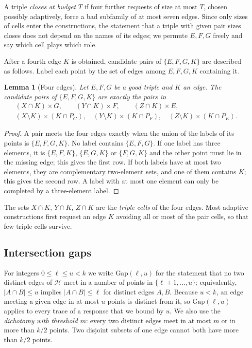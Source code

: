 \documentclass[11pt]{article}
\numberwithin{equation}{section}
\newtheorem{lemma}[theorem]{Lemma}
\theoremstyle{definition}
\theoremstyle{remark}
\newcommand{\HH}{\mathcal H}
\newcommand{\Gap}{\mathrm{Gap}}
\begin{document}
A triple \emph{closes at budget $T$} if four further requests of size at
most $T$, chosen possibly adaptively, force a bad subfamily of at most
seven edges. Since only sizes of cells enter the constructions, the
statement that a triple with given pair sizes closes does not depend on
the names of its edges; we permute $E,F,G$ freely and say which cell
plays which role.

After a fourth edge $K$ is obtained, candidate pairs of $\{E,F,G,K\}$
are described as follows. Label each point by the set of edges among
$E,F,G,K$ containing it.

\begin{lemma}[Four edges]\label{lem:foursets}
Let $E,F,G$ be a good triple and $K$ an edge. The candidate pairs of
$\{E,F,G,K\}$ are exactly the pairs in
\begin{gather*}
 (X\cap K)\times G,\qquad (Y\cap K)\times F,\qquad (Z\cap K)\times E,\\
 (X\setminus K)\times(K\cap P_G),\quad
 (Y\setminus K)\times(K\cap P_F),\quad
 (Z\setminus K)\times(K\cap P_E).
\end{gather*}
\end{lemma}
\begin{proof}
A pair meets the four edges exactly when the union of the labels of its
points is $\{E,F,G,K\}$. No label contains $\{E,F,G\}$. If one label has
three elements, it is $\{E,F,K\}$, $\{E,G,K\}$ or $\{F,G,K\}$ and the
other point must lie in the missing edge; this gives the first row. If
both labels have at most two elements, they are complementary
two-element sets, and one of them contains $K$; this gives the second
row. A label with at most one element can only be completed by a
three-element label.
\end{proof}

The sets $X\cap K$, $Y\cap K$, $Z\cap K$ are the \emph{triple cells} of
the four edges. Most adaptive constructions first request an edge $K$
avoiding all or most of the pair cells, so that few triple cells
survive.

\subsection{Intersection gaps}
For integers $0\le\ell\le u<k$ we write $\Gap(\ell,u)$ for the statement
that no two distinct edges of $\HH$ meet in a number of points in
$\{\ell+1,\dots,u\}$; equivalently, $|A\cap B|\le u$ implies
$|A\cap B|\le\ell$ for distinct edges $A,B$. Because $u<k$, an edge
meeting a given edge in at most $u$ points is distinct from it, so
$\Gap(\ell,u)$ applies to every trace of a response that we bound by
$u$. We also use the \emph{dichotomy with threshold $m$}: every two
distinct edges meet in at most $m$ or in more than $k/2$ points. Two
disjoint subsets of one edge cannot both have more than $k/2$ points.
\end{document}
